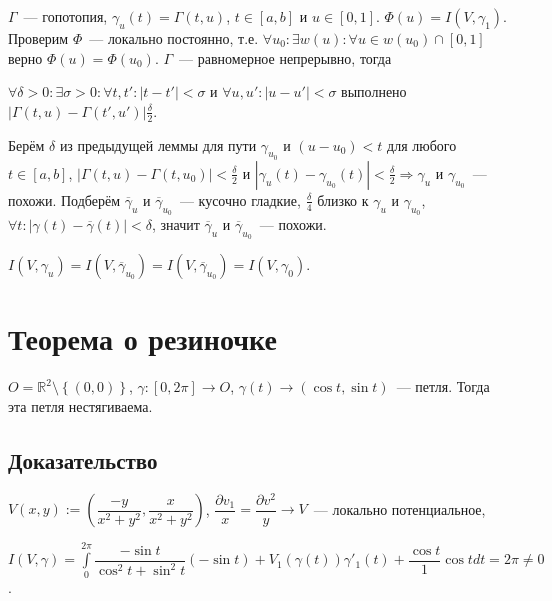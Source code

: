 \documentclass{article}
\begin{document}
            $\Gamma$~--- гопотопия, $\gamma_u(t) = \Gamma(t, u)$, $t \in [a, b]$ и $u \in [0, 1]$. $\Phi(u) = I(V, \gamma_1)$. Проверим $\Phi$~--- локально постоянно, т.е. $\forall u_0 : \exists w(u) : \forall u \in w(u_0) \cap [0, 1]$ верно $\Phi(u) = \Phi(u_0)$. $\Gamma$~--- равномерное непрерывно, тогда
            
            $\forall \delta > 0 : \exists \sigma > 0 : \forall t, t' : | t - t' | < \sigma$ и $\forall u, u' : | u - u' | < \sigma$ выполнено $\left| \Gamma(t, u) - \Gamma(t', u') \right|  \frac{\delta}{2}$.
            
            Берём $\delta$ из предыдущей леммы для пути $\gamma_{u_0}$ и $(u - u_0) < t$ для любого $t \in [a, b]$, $\left| \Gamma(t, u) - \Gamma(t, u_0) \right| < \frac{\delta}{2}$ и $\left| \gamma_u(t) - \gamma_{u_0}(t) \right| < \frac{\delta}{2} \Rightarrow \gamma_u$ и $\gamma_{u_0}$~--- похожи. Подберём $\overline{\gamma}_u$ и $\overline{\gamma}_{u_0}$~--- кусочно гладкие, $\frac{\delta}{4}$ близко к $\gamma_u$ и $\gamma_{u_0}$, $\forall t : | \gamma(t) - \overline{\gamma}(t) | < \delta$, значит $\overline{\gamma}_u$ и $\overline{\gamma}_{u_0}$~--- похожи.
            
            $I(V, \gamma_u) = I(V, \overline{\gamma}_{u_0}) = I(V, \overline{\gamma}_{u_0}) = I(V, \gamma_0)$.
    
    \newpage
    
    \section{Теорема о  резиночке}
    
        $O = \mathbb{R}^2 \setminus \left\{ (0, 0) \right\}$, $\gamma : [0, 2 \pi] \rightarrow O$, $\gamma(t) \rightarrow (\cos{t}, \sin{t})$~--- петля. Тогда эта петля нестягиваема.
        
        \subsection{Доказательство}
        
            $V(x, y) := \left( \dfrac{-y}{x^2 + y^2}, \dfrac{x}{x^2 + y^2} \right)$, $\dfrac{\partial v_1}{x} = \dfrac{\partial v^2}{y} \rightarrow V$~--- локально потенциальное,
            
            $I(V, \gamma) = \int\limits^{2 \pi}_0 \dfrac{-\sin{t}}{\cos^2{t} + \sin^2{t}} (-\sin{t}) + V_1(\gamma(t))\gamma'_1(t) + \dfrac{\cos{t}}{1} \cos{t}dt = 2 \pi \neq 0$.
            
\end{document}
